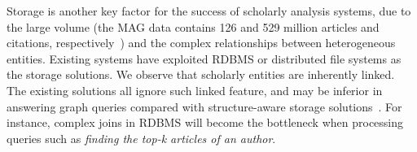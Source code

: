 Storage is another key factor for the success of scholarly analysis systems, due to the large volume (\eg the MAG data contains 126 and 529 million articles and citations, respectively~\cite{sinha2015overview}) and the complex relationships between heterogeneous entities.
Existing systems have exploited RDBMS or distributed file systems as the storage solutions.
%
We observe that scholarly entities are inherently linked. The existing solutions all ignore such linked feature, and may be inferior in answering graph queries compared with structure-aware storage solutions~\cite{BigGraphSearch}. For instance, complex joins in RDBMS will become the bottleneck when processing queries such as {\em finding the top-k articles of an author}.



